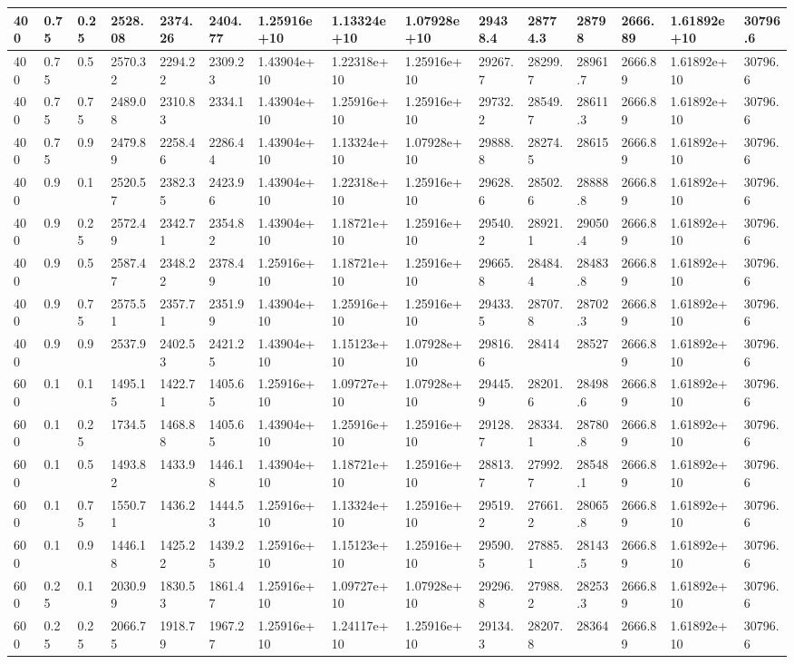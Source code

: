 \begin{table}[!htbp]
\begin{tabularx}{\textwidth}{|p{0.4cm}|*{2}{p{0.2cm}|}*{12}{X|}}
400&0.75&0.25&2528.08&2374.26&2404.77&1.25916e+10&1.13324e+10&1.07928e+10&29438.4&28774.3&28798&2666.89&1.61892e+10&30796.6\\\hline
400&0.75&0.5&2570.32&2294.22&2309.23&1.43904e+10&1.22318e+10&1.25916e+10&29267.7&28299.7&28961.7&2666.89&1.61892e+10&30796.6\\\hline
400&0.75&0.75&2489.08&2310.83&2334.1&1.43904e+10&1.25916e+10&1.25916e+10&29732.2&28549.7&28611.3&2666.89&1.61892e+10&30796.6\\\hline
400&0.75&0.9&2479.89&2258.46&2286.44&1.43904e+10&1.13324e+10&1.07928e+10&29888.8&28274.5&28615&2666.89&1.61892e+10&30796.6\\\hline
400&0.9&0.1&2520.57&2382.35&2423.96&1.43904e+10&1.22318e+10&1.25916e+10&29628.6&28502.6&28888.8&2666.89&1.61892e+10&30796.6\\\hline
400&0.9&0.25&2572.49&2342.71&2354.82&1.43904e+10&1.18721e+10&1.25916e+10&29540.2&28921.1&29050.4&2666.89&1.61892e+10&30796.6\\\hline
400&0.9&0.5&2587.47&2348.22&2378.49&1.25916e+10&1.18721e+10&1.25916e+10&29665.8&28484.4&28483.8&2666.89&1.61892e+10&30796.6\\\hline
400&0.9&0.75&2575.51&2357.71&2351.99&1.43904e+10&1.25916e+10&1.25916e+10&29433.5&28707.8&28702.3&2666.89&1.61892e+10&30796.6\\\hline
400&0.9&0.9&2537.9&2402.53&2421.25&1.43904e+10&1.15123e+10&1.07928e+10&29816.6&28414&28527&2666.89&1.61892e+10&30796.6\\\hline
600&0.1&0.1&1495.15&1422.71&1405.65&1.25916e+10&1.09727e+10&1.07928e+10&29445.9&28201.6&28498.6&2666.89&1.61892e+10&30796.6\\\hline
600&0.1&0.25&1734.5&1468.88&1405.65&1.43904e+10&1.25916e+10&1.25916e+10&29128.7&28334.1&28780.8&2666.89&1.61892e+10&30796.6\\\hline
600&0.1&0.5&1493.82&1433.9&1446.18&1.43904e+10&1.18721e+10&1.25916e+10&28813.7&27992.7&28548.1&2666.89&1.61892e+10&30796.6\\\hline
600&0.1&0.75&1550.71&1436.2&1444.53&1.25916e+10&1.13324e+10&1.25916e+10&29519.2&27661.2&28065.8&2666.89&1.61892e+10&30796.6\\\hline
600&0.1&0.9&1446.18&1425.22&1439.25&1.25916e+10&1.15123e+10&1.25916e+10&29590.5&27885.1&28143.5&2666.89&1.61892e+10&30796.6\\\hline
600&0.25&0.1&2030.99&1830.53&1861.47&1.25916e+10&1.09727e+10&1.07928e+10&29296.8&27988.2&28253.3&2666.89&1.61892e+10&30796.6\\\hline
600&0.25&0.25&2066.75&1918.79&1967.27&1.25916e+10&1.24117e+10&1.25916e+10&29134.3&28207.8&28364&2666.89&1.61892e+10&30796.6\\\hline

\end{tabularx}
\end{table}

